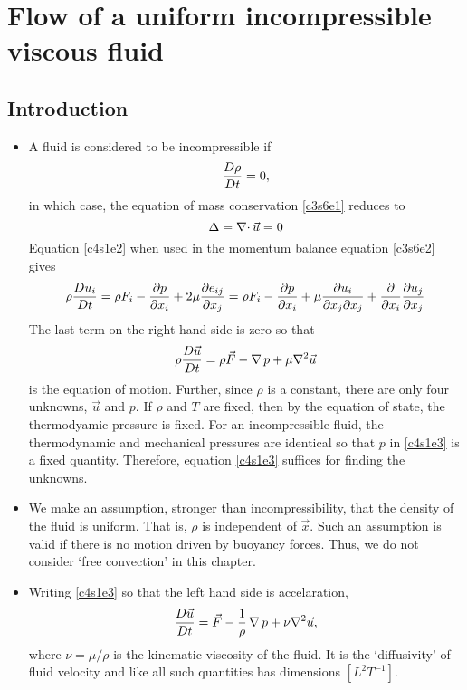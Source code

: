 \chapter{Flow of a uniform incompressible viscous fluid}\label{c4}
\section{Introduction}\label{c4s1}
\begin{itemize}
\item A fluid is considered to be incompressible if
\begin{equation}\label{c4s1e1}
\frac{D{\rho}}{Dt} = 0,
\end{equation}
in which case, the equation of mass conservation \eqref{c3s6e1} reduces to
\begin{equation}\label{c4s1e2}
\Delta = \operatorname{\nabla\cdot}\vec{u} = 0
\end{equation}
Equation \eqref{c4s1e2} when used in the momentum balance equation \eqref{c3s6e2} gives
\[
\rho\frac{D{u_i}}{Dt} = \rho F_i - \frac{\partial{p}}{\partial{x_i}} + 2\mu\frac{\partial e_{ij}}{\partial x_j} = 
\rho F_i - \frac{\partial{p}}{\partial{x_i}} + \mu\frac{\partial u_i}{\partial x_j \partial x_j} + \frac{\partial}{\partial x_i}\frac{\partial{u_j}}{\partial{x_j}}
\]
The last term on the right hand side is zero so that
\begin{equation}\label{c4s1e3} 
\rho\frac{D{\vec{u}}}{Dt} = \rho\vec{F} - \operatorname{\nabla} p + \mu\nabla^2\vec{u}
\end{equation}
is the equation of motion. Further, since $\rho$ is a constant, there are only four unknowns, $\vec{u}$ and $p$. If $\rho$ and $T$ are fixed, then by the equation of state, the thermodyamic
pressure is fixed. For an incompressible fluid, the thermodynamic and mechanical pressures are identical so that $p$ in \eqref{c4s1e3} is a fixed quantity. Therefore, equation \eqref{c4s1e3} 
suffices for finding the unknowns.

\item We make an assumption, stronger than incompressibility, that the density of the fluid is uniform. That is, $\rho$ is independent of $\vec{x}$. Such an assumption is valid if there
is no motion driven by buoyancy forces. Thus, we do not consider \enquote*{free convection} in this chapter.

\item Writing \eqref{c4s1e3} so that the left hand side is accelaration, 
\[
\frac{D{\vec{u}}}{Dt} = \vec{F} - \frac{1}{\rho}\operatorname{\nabla} p + \nu\nabla^2\vec{u},
\]
where $\nu = \mu/\rho$ is the kinematic viscosity of the fluid. It is the \enquote*{diffusivity} of fluid velocity and like all such quantities has dimensions $[L^2 T^{-1}]$.


\end{itemize}
